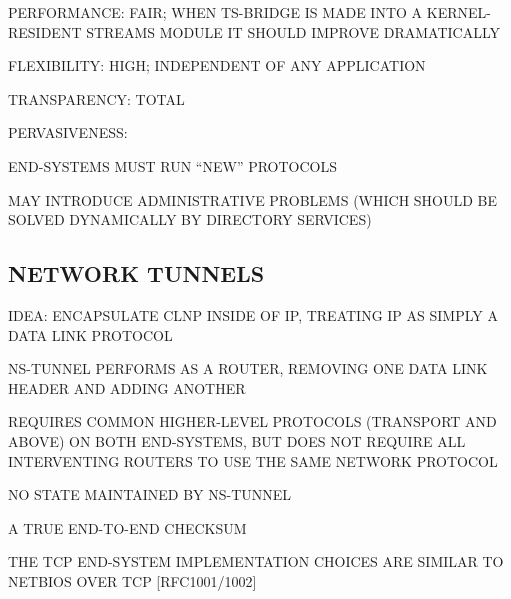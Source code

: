 \begin{bwslide}

\begin{nrtc}
\item	PERFORMANCE: FAIR; WHEN TS-BRIDGE IS MADE INTO A KERNEL-RESIDENT
	STREAMS MODULE IT SHOULD IMPROVE DRAMATICALLY

\item	FLEXIBILITY: HIGH; INDEPENDENT OF ANY APPLICATION

\item	TRANSPARENCY: TOTAL

\item	PERVASIVENESS:
    \begin{nrtc}
    \item	END-SYSTEMS MUST RUN ``NEW'' PROTOCOLS

    \item	MAY INTRODUCE ADMINISTRATIVE PROBLEMS (WHICH SHOULD BE SOLVED
		DYNAMICALLY BY DIRECTORY SERVICES)
    \end{nrtc}
\end{nrtc}
\end{bwslide}


\begin{bwslide}
\part*	{NETWORK TUNNELS}\bf

\begin{nrtc}
\item	IDEA: ENCAPSULATE CLNP INSIDE OF IP, TREATING IP AS SIMPLY A DATA LINK
	PROTOCOL

\item	NS-TUNNEL PERFORMS AS A ROUTER, REMOVING ONE DATA LINK HEADER AND
	ADDING ANOTHER

\item	REQUIRES COMMON HIGHER-LEVEL PROTOCOLS (TRANSPORT AND ABOVE) ON BOTH
	END-SYSTEMS, BUT DOES NOT REQUIRE ALL INTERVENTING ROUTERS TO USE THE
	SAME NETWORK PROTOCOL
\end{nrtc}
\end{bwslide}




\begin{bwslide}

\begin{nrtc}
\item	NO STATE MAINTAINED BY NS-TUNNEL

\item	A TRUE END-TO-END CHECKSUM

\item	THE TCP END-SYSTEM IMPLEMENTATION CHOICES ARE SIMILAR TO NETBIOS OVER
	TCP [RFC1001/1002]
\end{nrtc}
\end{bwslide}


